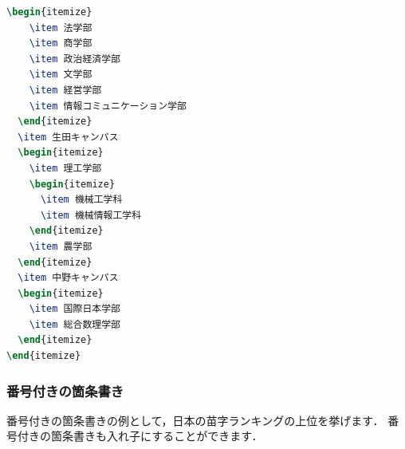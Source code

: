 \documentclass[
    paper=a4paper,      %
    article,            %
    fontsize=11pt,      %
    jafontsize=11pt,    %
    head_space=25mm,    %
    foot_space=25mm,    %
    gutter=20mm,        %
    fore-edge=20mm      %
    ]{jlreq}            %
\begin{document}
\begin{multicols}{2}
\begin{lstlisting}[language=TeX]
  \begin{itemize}
    \item 法学部
    \item 商学部
    \item 政治経済学部
    \item 文学部
    \item 経営学部
    \item 情報コミュニケーション学部
  \end{itemize}
  \item 生田キャンパス
  \begin{itemize}
    \item 理工学部
    \begin{itemize}
      \item 機械工学科
      \item 機械情報工学科
    \end{itemize}
    \item 農学部
  \end{itemize}
  \item 中野キャンパス
  \begin{itemize}
    \item 国際日本学部
    \item 総合数理学部
  \end{itemize}
\end{itemize}
\end{lstlisting}
\end{multicols}

\vspace{-2mm}

\subsubsection{番号付きの箇条書き}
\label{sssec:enumerate}

番号付きの箇条書きの例として，日本の苗字ランキングの上位を挙げます．
番号付きの箇条書きも入れ子にすることができます．
\end{document}
